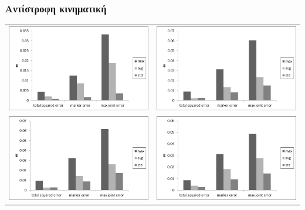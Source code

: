 \documentclass[8pt,sans,mathserif]{beamer}%
\begin{document}
\begin{frame}
\frametitle{Αντίστροφη κινηματική}
    
    \begin{center}
        \begin{tabular}{cc}
            \includegraphics[width=.48\textwidth, height = 0.25\textheight, keepaspectratio]{fig/ik-reg1.png} & \includegraphics[width=.48\textwidth, height = 0.25\textheight, keepaspectratio]{fig/ik-reg2.png}\\[3pt]
            \includegraphics[width=.48\textwidth, height = 0.25\textheight, keepaspectratio]{fig/ik-reg3.png} & \includegraphics[width=.48\textwidth, height = 0.25\textheight, keepaspectratio]{fig/ik-reg4.png}\\[3pt]

\end{tabular}
\end{center}
\end{frame}
\end{document}
